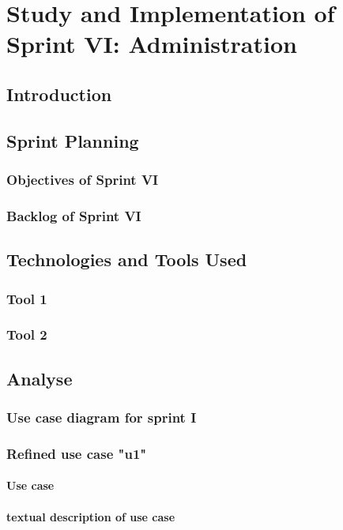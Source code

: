 \chapter[Sprint VI]{Study and Implementation of Sprint VI: Administration}

\minitoc
\section{Introduction}
\section{Sprint Planning}
\subsection{Objectives of Sprint VI}
\subsection{Backlog of Sprint VI}
\section{Technologies and Tools Used}
\subsection{Tool 1}
\subsection{Tool 2}

\section{Analyse}
\subsection{Use case diagram for sprint I}
\subsection{Refined use case "u1"}
\subsubsection{Use case}
\subsubsection{textual description of use case}

